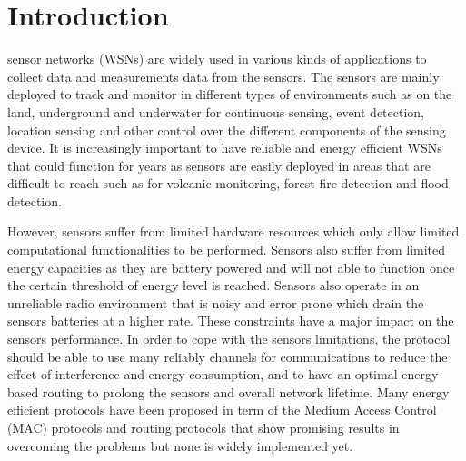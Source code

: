 \section{Introduction}

% 
% 
% 
% 

 sensor networks (WSNs) are widely used in various kinds of applications to collect data and measurements data from the sensors. 
The sensors are mainly deployed to track and monitor in different types of environments such as on the land, underground and underwater for continuous sensing, event detection, location sensing and other control over the different components of the sensing device. 
It is increasingly important to have reliable and energy efficient WSNs that could function for years as sensors are easily deployed in areas that are difficult to reach such as for volcanic monitoring, forest fire detection and flood detection.

However, sensors suffer from limited hardware resources which only allow limited computational functionalities to be performed. Sensors also suffer from limited energy capacities as they are battery powered and will not able to function once the certain threshold of energy level is reached. 
Sensors also operate in an unreliable radio environment that is noisy and error prone which drain the sensors batteries at a higher rate. These constraints have a major impact on the sensors performance. 
In order to cope with the sensors limitations, the protocol should be able to use many reliably channels for communications to reduce the effect of interference and energy consumption, and to have an optimal energy-based routing to prolong the sensors and overall network lifetime.
Many energy efficient protocols have been proposed in term of the Medium Access Control (MAC) protocols and routing protocols that show promising results in overcoming the problems but none is widely implemented yet.

